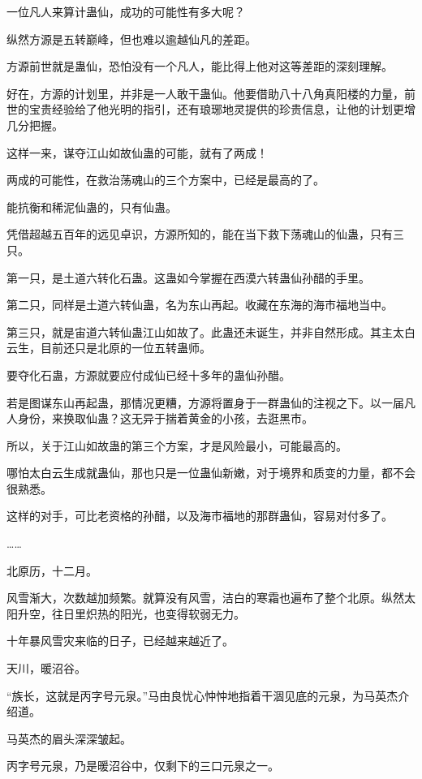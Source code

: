 
\begin{this_body}

一位凡人来算计蛊仙，成功的可能性有多大呢？

纵然方源是五转巅峰，但也难以逾越仙凡的差距。

方源前世就是蛊仙，恐怕没有一个凡人，能比得上他对这等差距的深刻理解。

好在，方源的计划里，并非是一人敢干蛊仙。他要借助八十八角真阳楼的力量，前世的宝贵经验给了他光明的指引，还有琅琊地灵提供的珍贵信息，让他的计划更增几分把握。

这样一来，谋夺江山如故仙蛊的可能，就有了两成！

两成的可能性，在救治荡魂山的三个方案中，已经是最高的了。

能抗衡和稀泥仙蛊的，只有仙蛊。

凭借超越五百年的远见卓识，方源所知的，能在当下救下荡魂山的仙蛊，只有三只。

第一只，是土道六转化石蛊。这蛊如今掌握在西漠六转蛊仙孙醋的手里。

第二只，同样是土道六转仙蛊，名为东山再起。收藏在东海的海市福地当中。

第三只，就是宙道六转仙蛊江山如故了。此蛊还未诞生，并非自然形成。其主太白云生，目前还只是北原的一位五转蛊师。

要夺化石蛊，方源就要应付成仙已经十多年的蛊仙孙醋。

若是图谋东山再起蛊，那情况更糟，方源将置身于一群蛊仙的注视之下。以一届凡人身份，来换取仙蛊？这无异于揣着黄金的小孩，去逛黑市。

所以，关于江山如故蛊的第三个方案，才是风险最小，可能最高的。

哪怕太白云生成就蛊仙，那也只是一位蛊仙新嫩，对于境界和质变的力量，都不会很熟悉。

这样的对手，可比老资格的孙醋，以及海市福地的那群蛊仙，容易对付多了。

……

北原历，十二月。

风雪渐大，次数越加频繁。就算没有风雪，洁白的寒霜也遍布了整个北原。纵然太阳升空，往日里炽热的阳光，也变得软弱无力。

十年暴风雪灾来临的日子，已经越来越近了。

天川，暖沼谷。

“族长，这就是丙字号元泉。”马由良忧心忡忡地指着干涸见底的元泉，为马英杰介绍道。

马英杰的眉头深深皱起。

丙字号元泉，乃是暖沼谷中，仅剩下的三口元泉之一。


\end{this_body}
